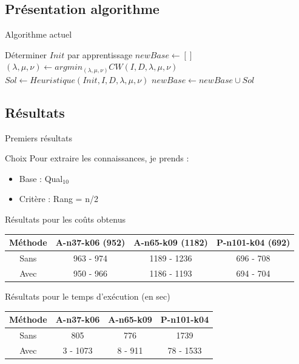 \documentclass{beamer}
\begin{document}
\subsection{Présentation algorithme}
\begin{frame}{Algorithme actuel}

\begin{algorithm}[H]
\DontPrintSemicolon %
Déterminer $Init$ par apprentissage\;
$newBase \gets []$\;
 {
	$(\lambda,\mu,\nu) \gets argmin_{(\lambda,\mu,\nu)}CW(I,D,\lambda,\mu,\nu)$\;
	 {
		$Sol \gets Heuristique(Init,I,D,\lambda,\mu,\nu)$\;
		$newBase \gets newBase \cup Sol$\;
	}
}
\;

\end{algorithm}

\end{frame}

\subsection{Résultats}

\begin{frame}{Premiers résultats}
\begin{block}{Choix}
Pour extraire les connaissances, je prends :
\begin{itemize}
\item Base : Qual$_{10}$
\item Critère : Rang = n/2
\end{itemize}
\end{block}

Résultats pour les coûts obtenus
\begin{tabular}{|c|c|c|c|}
   \hline
   Méthode  & A-n37-k06 (952) & A-n65-k09 (1182) & P-n101-k04 (692)  \\
   \hline
   Sans & 963 - 974  & 1189 - 1236 & 696 - 708   \\
   \hline
   Avec & 950 - 966 & 1186 - 1193 & 694 - 704  \\
   \hline
\end{tabular}

Résultats pour le temps d'exécution (en sec)
\begin{tabular}{|c|c|c|c|}
   \hline
   Méthode  & A-n37-k06 & A-n65-k09 & P-n101-k04  \\
   \hline
   Sans & 805  & 776 &  1739  \\
   \hline
   Avec & 3 - 1073 & 8 - 911 & 78 - 1533  \\
   \hline
\end{tabular}

\end{frame}
\end{document}
